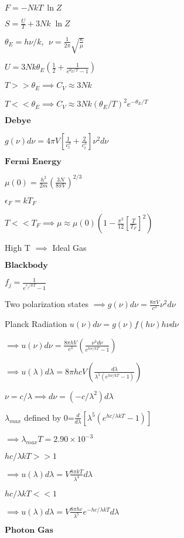 \documentclass{article}
\begin{document}
\begin{multicols}{3}
$F= -NkT\:\ln Z$

$S=\frac{U}{T} + 3Nk \;\ln Z$

$\theta_E = h \nu / k, \:\:\nu = \frac{1}{2 \pi} \sqrt{\frac{\kappa}{\mu}}$

$U=3Nk\theta_E (\frac{1}{2}+\frac{1}{e^{\theta_E/T}-1})$

$T>>\theta_E \implies C_V \approx 3Nk$

$T<<\theta_E \implies C_V \approx 3Nk(\theta_E/T)^2 e^{-\theta_E/T}$

$\textbf{Debye}$

$g(\nu)d\nu=4\pi V\left[ \frac{1}{c_l^3} + \frac{2}{c_t^3} \right] \nu^2d\nu$

$\textbf{Fermi Energy}$

$\mu(0)=\frac{h^2}{2m} \left( \frac{3N}{8\pi V} \right)^{2/3}$

$\epsilon_F=k T_F$

$T<<T_F \implies \mu \approx \mu(0) \left ( 1-\frac{\pi^2}{12} \left[ \frac{T}{T_F} \right]^2 \right)$

High T $\implies$ Ideal Gas

$\textbf{Blackbody}$

$f_j=\frac{1}{e^{\epsilon_j/kT}-1}$

Two polarization states $\implies g(\nu)d\nu=\frac{8\pi V}{c^3}\nu^2d\nu$

Planck Radiation $u(\nu)d\nu=g(\nu)f(h\nu)h\nu d\nu$

$\implies u(\nu)d\nu=\frac{8\pi h V}{c^3} \left ( \frac{\nu^3 d\nu}{e^{h\nu /kT}-1} \right )$

$\implies u(\lambda)d\lambda=8\pi hcV \left ( \frac{d\lambda}{\lambda^5 (e^{h\nu /kT}-1)} \right )$

$\nu=c/\lambda \implies d\nu=(-c/\lambda^2)d\lambda$

$\lambda_{max}$ defined by 0=$\frac{d}{d\lambda}[\lambda^5(e^{hc/\lambda kT}-1)]$

$\implies \lambda_{max}T=2.90 \times 10^{-3}$

$hc/\lambda kT >> 1$

$\implies u(\lambda)d\lambda=V\frac{8\pi kT}{\lambda^4}d\lambda$

$hc/\lambda kT << 1$

$\implies u(\lambda)d\lambda=V\frac{8\pi hc}{\lambda^5}e^{-hc/\lambda kT}d\lambda$

$\textbf{Photon Gas}$


\end{multicols}
\end{document}
